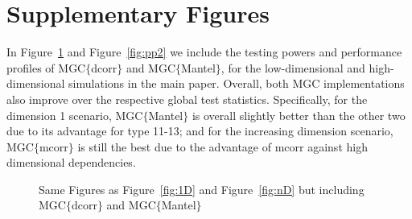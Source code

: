 \documentclass[11pt]{article}
\begin{document}
\section{Supplementary Figures}
\label{appen:figure}
In Figure~\ref{fig:D2} and Figure~\ref{fig:pp2} we include the testing powers and performance profiles of MGC$\{$dcorr$\}$ and MGC$\{$Mantel$\}$, for the low-dimensional and high-dimensional simulations in the main paper. Overall, both MGC implementations also improve over the respective global test statistics. Specifically, for the dimension 1 scenario, MGC$\{$Mantel$\}$ is overall slightly better than the other two due to its advantage for type 11-13; and for the increasing dimension scenario, MGC$\{$mcorr$\}$ is still the best due to the advantage of mcorr against high dimensional dependencies.

\begin{figure}[htbp]
\hfil
{}
\caption{Same Figures as Figure~\ref{fig:1D} and Figure~\ref{fig:nD} but including MGC$\{$dcorr$\}$ and MGC$\{$Mantel$\}$}
\label{fig:D2}
\end{figure}
\end{document}
